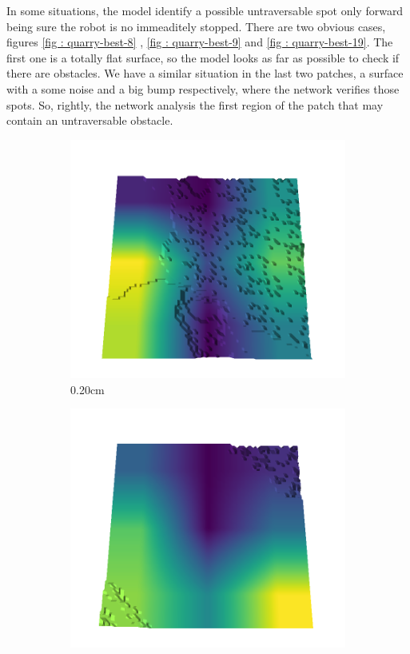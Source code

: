 \documentclass[../document.tex]{subfiles}
\begin{document}
In some situations, the model identify a possible untraversable spot only forward being sure the robot is no immeaditely stopped. There are two obvious cases, figures \ref{fig : quarry-best-8} ,  \ref{fig : quarry-best-9} and \ref{fig : quarry-best-19}. The first one is a totally flat surface, so the model looks as far as possible to check if there are obstacles. We have a similar situation in the last two patches, a surface with a some noise and a big bump respectively, where the network verifies those spots. So, rightly, the network analysis the first region of the patch that may contain an untraversable obstacle. 
\begin{figure}[H]
    \centering
    \begin{subfigure}[b]{0.192\linewidth}
    \includegraphics[width=\linewidth]{../img/5/quarry/best/20-patch-3d-majavi-colormap-0.png}
    \caption{0.20cm}
    \label{fig : quarry-best-1}
    \end{subfigure}
    \begin{subfigure}[b]{0.192\linewidth}
    \includegraphics[width=\linewidth]{../img/5/quarry/best/25-patch-3d-majavi-colormap-10.png}

\end{subfigure}
\end{figure}
\end{document}
